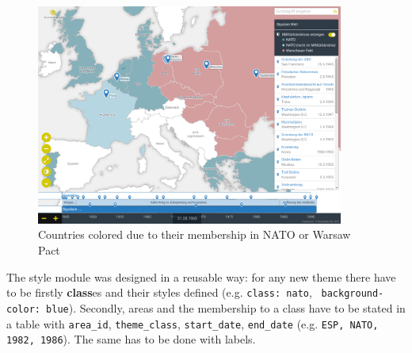 \begin{figure}[H]
  \begin{center}
    \includegraphics[width=0.9\textwidth]{graphics/bipolar_world.png}
  \end{center}
  \caption{Countries colored due to their membership in NATO or Warsaw Pact}
  \label{fig:biplar_world}
\end{figure}

The style module was designed in a reusable way: for any new theme there have to be firstly \textbf{class}es and their styles defined (e.g. \texttt{class: nato}, ~\texttt{background-color: blue}). Secondly, areas and the membership to a class have to be stated in a table with \texttt{area\_id}, \texttt{theme\_class}, \texttt{start\_date}, \texttt{end\_date} (e.g. \texttt{ESP, NATO, 1982, 1986}). The same has to be done with labels.



